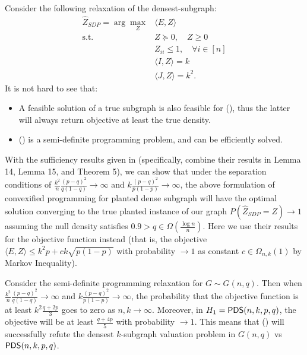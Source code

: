 \documentclass[final,12pt]{colt2023} %
\newcommand\1[1]{\mathbb{I}_{\left\{#1\right\}}}
\begin{document}
Consider the following relaxation of the densest-subgraph:
\begin{align}
\widehat{Z}_{SDP} = \arg\max_{Z}  & \langle E, Z \rangle     \nonumber     \\
\text{s.t.	} & Z \succeq 0,\quad Z\geq 0   \label{eq:PDSCVX_SL}  \\
& Z_{ii} \leq 1, \quad \forall i \in [n]\nonumber \\
& \langle I, Z \rangle  = k  \nonumber  \\
 & \langle J, Z \rangle = k^2.  \nonumber
\end{align}
It is not hard to see that:
\begin{itemize}
    \item A feasible solution of a true subgraph is also feasible for (), thus the latter will always return objective at least the true density.
    \item () is a semi-definite programming problem, and can be efficiently solved.
\end{itemize}
With the sufficiency results given in \cite{HWX16} (specifically, combine their results in Lemma 14, Lemma 15, and Theorem 5), we can show that under the separation conditions of $\frac{k^2}{n}\frac{(p-q)^2}{q(1-q)}\to\infty$ and $k\frac{(p-q)^2}{p(1-p)}\to\infty$, the above formulation of convexified programming for planted dense subgraph will have the optimal solution converging to the true planted instance of our graph $P(\hat Z_{SDP}=Z)\to 1$ assuming the null density satisfies $0.9>q\in\Omega(\frac{\log n}{n})$. Here we use their results for the objective function instead (that is, the objective $\langle E, Z \rangle\leq k^2p+ck\sqrt{p(1-p)}$ with probability $\to 1$ as constant $c\in\Omega_{n, k}(1)$ by Markov Inequality).

\begin{theorem}
Consider the semi-definite programming relaxation for $G\sim G(n, q)$. Then when $\frac{k^2}{n}\frac{(p-q)^2}{q(1-q)}\to\infty$ and $k\frac{(p-q)^2}{p(1-p)}\to\infty$, the probability that the objective function is at least $k^2 \frac{q+2p}{3}$ goes to zero as $n, k\to\infty$. Moreover, in $H_1=\mathsf{PDS}(n, k, p, q)$, the objective will be at least $\frac{q+4p}{5}$ with probability $\to 1$. This means that () will successfully refute the densest $k$-subgraph valuation problem in $G(n, q)$ vs $\mathsf{PDS}(n, k, p, q)$.
\end{theorem}
\end{document}
